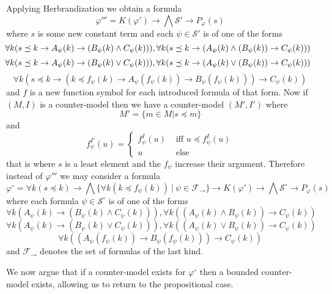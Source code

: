 \documentclass[a4paper,12pt]{report}
\theoremstyle{definition}
\theoremstyle{definition}
\theoremstyle{definition}
\theoremstyle{definition}
\theoremstyle{definition}
\theoremstyle{definition}
\theoremstyle{definition}
\begin{document}
	Applying Herbrandization we obtain a formula
	$$\varphi''' = K(\varphi')\to \bigwedge \mathcal S'\to P_\varphi(s)$$
	where $s$ is some new constant term and each $\psi\in\mathcal S'$ is of one of the forms
	$$\hspace*{-2mm}\forall k(s\preceq k\to A_\psi(k)\to (B_\psi(k)\wedge C_\psi(k))), \forall k(s\preceq k\to (A_\psi(k)\wedge (B_\psi(k))\to C_\psi(k)))$$
	$$\hspace*{-2mm}\forall k(s\preceq k\to A_\psi(k)\to (B_\psi(k)\vee C_\psi(k))), \forall k(s\preceq k\to (A_\psi(k)\vee (B_\psi(k))\to C_\psi(k)))$$
	$$\forall k(s\preceq k\to (k\preceq f_\psi(k) \to A_\psi(f_\psi(k))\to B_\psi(f_\psi(k)))\to C_\psi(k))$$
	and $f$ is a new function symbol for each introduced formula of that form. Now if $(M, I)$ is a counter-model then we have a counter-model $(M',I')$ where $$M' = \{m\in M|s\preceq m\}$$ and 
	$$f_\psi^{I'}(u) = \begin{cases}
		f^I_\psi(u)&\text{ iff $u\preceq f^{I}_\psi(u)$}\\
		u&\text{ else}
	\end{cases}$$ that is where $s$ is a least element and the $f_\psi$ increase their argument. Therefore instead of $\varphi'''$ we may consider a formula $$\varphi^\circ = \forall k(s\preceq k)\to \bigwedge\{\forall k(k\preceq f_\psi(k))\:|\:\psi\in\mathcal F_\to\}\to K(\varphi')\to \bigwedge \mathcal S^\circ\to P_\varphi(s)$$ where each formula $\psi\in\mathcal S^\circ$ is of one of the forms
	$$\forall k(A_\psi(k)\to (B_\psi(k)\wedge C_\psi(k))), \forall k((A_\psi(k)\wedge B_\psi(k))\to C_\psi(k))$$
	$$\forall k(A_\psi(k)\to (B_\psi(k)\vee C_\psi(k))), \forall k((A_\psi(k)\vee B_\psi(k))\to C_\psi(k))$$
	$$\forall k((A_\psi(f_\psi(k))\to B_\psi(f_\psi(k)))\to C_\psi(k))$$
	and $\mathcal F_\to$ denotes the set of formulas of the last kind.
	
	We now argue that if a counter-model exists for $\varphi^\circ$ then a bounded counter-model exists, allowing us to return to the propositional case.
	
\end{document}
